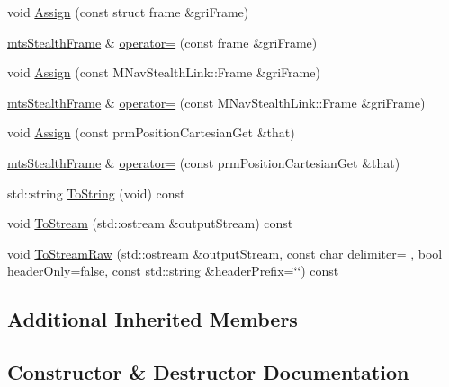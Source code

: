 \begin{DoxyCompactItemize}
void \hyperlink{classmts_stealth_frame_af72faf583bebe3370e6bbc1436f57573}{Assign} (const struct frame \&gri\+Frame)
\item 
\hyperlink{classmts_stealth_frame}{mts\+Stealth\+Frame} \& \hyperlink{classmts_stealth_frame_a2c6000a1fa5bb27fae3a4f8c51a5312d}{operator=} (const frame \&gri\+Frame)
\item 
void \hyperlink{classmts_stealth_frame_af1699a73f8dfc4704d67edc43b994e7c}{Assign} (const M\+Nav\+Stealth\+Link\+::\+Frame \&gri\+Frame)
\item 
\hyperlink{classmts_stealth_frame}{mts\+Stealth\+Frame} \& \hyperlink{classmts_stealth_frame_aa96c149a0a583ec83a64142410f4c8c6}{operator=} (const M\+Nav\+Stealth\+Link\+::\+Frame \&gri\+Frame)
\item 
void \hyperlink{classmts_stealth_frame_ae570300bb135a8e9ab81d81e5456c552}{Assign} (const prm\+Position\+Cartesian\+Get \&that)
\item 
\hyperlink{classmts_stealth_frame}{mts\+Stealth\+Frame} \& \hyperlink{classmts_stealth_frame_a8350558bec876d3c65c609aecf3e2512}{operator=} (const prm\+Position\+Cartesian\+Get \&that)
\item 
std\+::string \hyperlink{classmts_stealth_frame_a04cfb56c66017fc8029c81ac91655e26}{To\+String} (void) const 
\item 
void \hyperlink{classmts_stealth_frame_ac6f6690c08ffaaad27f589a7dae4da28}{To\+Stream} (std\+::ostream \&output\+Stream) const 
\item 
void \hyperlink{classmts_stealth_frame_a0b6205e28c29ccc0ba25c553bea02419}{To\+Stream\+Raw} (std\+::ostream \&output\+Stream, const char delimiter= \textquotesingle{} \textquotesingle{}, bool header\+Only=false, const std\+::string \&header\+Prefix=\char`\"{}\char`\"{}) const 
\end{DoxyCompactItemize}
\subsection*{Additional Inherited Members}


\subsection{Constructor \& Destructor Documentation}
\hypertarget{classmts_stealth_frame_af32afe61af4982beef829344c6b96aea}{}
